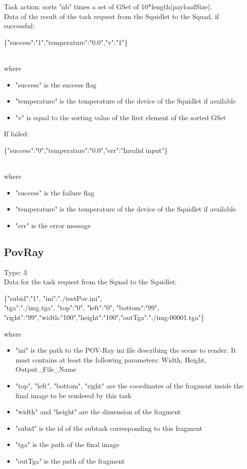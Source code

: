 Task action: sorts "nb" times a set of GSet of 10*length(payloadSize).\\

Data of the result of the task request from the Squidlet to the Squad, if successful:\\
\begin{ttfamily}\{"success":"1","temperature":"0.0","v":"1"\}\end{ttfamily}\\
where
\begin{itemize}
\item "success" is the success flag
\item "temperature" is the temperature of the device of the Squidlet if available
\item "v" is equal to the sorting value of the first element of the sorted GSet
\end{itemize}
If failed:\\
\begin{ttfamily}\{"success":"0","temperature":"0.0","err":"Invalid input"\}\end{ttfamily}\\
where
\begin{itemize}
\item "success" is the failure flag
\item "temperature" is the temperature of the device of the Squidlet if available
\item "err" is the error message
\end{itemize}

\subsection{PovRay}

Type: 3\\

Data for the task request from the Squad to the Squidlet:\\
\begin{ttfamily}\{"subid":"1", "ini":"./testPov.ini", \\
"tga":"./img.tga", "top":"0", "left":"0", "bottom":"99", \\
"right":"99","width:"100","height":"100","outTga":"./img-00001.tga"\}\end{ttfamily}
where
\begin{itemize}
\item "ini" is the path to the POV-Ray ini file describing the scene to render. It must contains at least the following parameters: Width, Height, Output\_File\_Name 
\item "top", "left", "bottom", "right" are the coordinates of the fragment inside the final image to be rendered by this task
\item "width" and "height" are the dimension of the fragment
\item "subid" is the id of the subtask corresponding to this fragment
\item "tga" is the path of the final image
\item "outTga" is the path of the fragment
\end{itemize}\\

